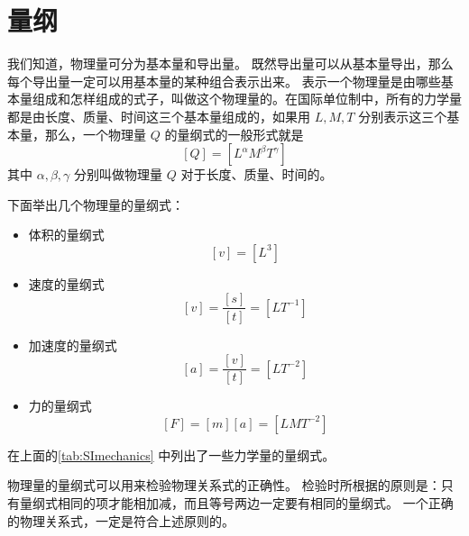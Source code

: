 \chapter{量纲}
我们知道，物理量可分为基本量和导出量。
既然导出量可以从基本量导出，那么每个导出量一定可以用基本量的某种组合表示出来。
表示一个物理量是由哪些基本量组成和怎样组成的式子，叫做这个物理量的。在国际单位制中，所有的力学量都是由长度、质量、时间这三个基本量组成的，如果用 $L,M,T$ 分别表示这三个基本量，那么，一个物理量 $Q$ 的量纲式的一般形式就是
\[[Q]=[L^{\alpha}M^{\beta}T^{\gamma}]\]
其中 $\alpha, \beta, \gamma$ 分别叫做物理量 $Q$ 对于长度、质量、时间的。

下面举出几个物理量的量纲式：
\begin{itemize}
  \item 体积的量纲式
  \[[v]=[L^3]  \]
  \item 速度的量纲式
  \[[v]=\frac{[s]}{[t]}=[LT^{-1}]  \] 
  \item 加速度的量纲式
  \[ [a]=\frac{[v]}{[t]}=[LT^{-2}] \]
  \item 力的量纲式
  \[ [F]=[m][a]=[LMT^{-2}] \]
\end{itemize}

在上面的\cref{tab:SImechanics} 中列出了一些力学量的量纲式。

物理量的量纲式可以用来检验物理关系式的正确性。
检验时所根据的原则是：只有量纲式相同的项才能相加减，而且等号两边一定要有相同的量纲式。
一个正确的物理关系式，一定是符合上述原则的。